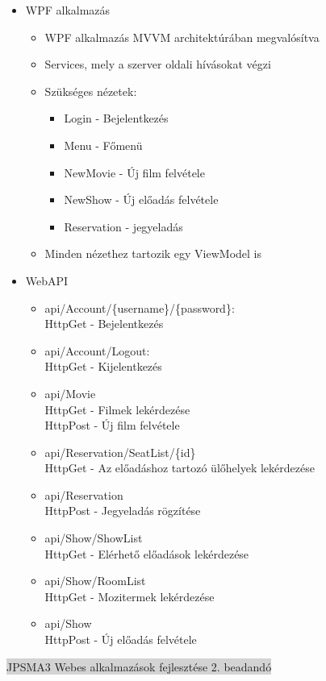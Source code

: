 \documentclass[11pt,a4paper]{article}
\begin{document}
\begin{itemize}
\item WPF alkalmazás
\begin{itemize}
	\item WPF alkalmazás MVVM architektúrában megvalósítva
	\item Services, mely a szerver oldali hívásokat végzi
	\item Szükséges nézetek:
	\begin{itemize}
		\item Login - Bejelentkezés
		\item Menu - Főmenü
		\item NewMovie - Új film felvétele
		\item NewShow - Új előadás felvétele
		\item Reservation - jegyeladás
	\end{itemize}
	\item Minden nézethez tartozik egy ViewModel is
\end{itemize}

\item WebAPI
\begin{itemize}
\item api/Account/\{username\}/\{password\}:\\[0.1cm]
HttpGet - Bejelentkezés
\item api/Account/Logout:\\[0.1cm]
HttpGet - Kijelentkezés
\item api/Movie\\[0.1cm]
HttpGet - Filmek lekérdezése\\[0.1cm]
HttpPost - Új film felvétele
\item api/Reservation/SeatList/\{id\}\\[0.1cm]
HttpGet - Az előadáshoz tartozó ülőhelyek lekérdezése
\item api/Reservation\\[0.1cm]
HttpPost - Jegyeladás rögzítése
\item api/Show/ShowList\\[0.1cm]
HttpGet - Elérhető előadások lekérdezése
\item api/Show/RoomList\\[0.1cm]
HttpGet - Mozitermek lekérdezése
\item api/Show\\[0.1cm]
HttpPost - Új előadás felvétele
\end{itemize}
\end{itemize}
\newpage
\begin{center}
	\colorbox{lightgray}{{\large JPSMA3} \hspace{3cm} {\large Webes alkalmazások fejlesztése 2. beadandó} \hspace{5cm} \thepage}
\end{center}
\end{document}
